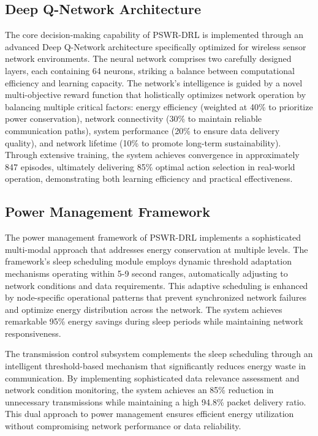 \subsection{Deep Q-Network Architecture}
\label{subsec:dqn_arch}
The core decision-making capability of PSWR-DRL is implemented through an advanced Deep Q-Network architecture specifically optimized for wireless sensor network environments. The neural network comprises two carefully designed layers, each containing 64 neurons, striking a balance between computational efficiency and learning capacity. The network's intelligence is guided by a novel multi-objective reward function that holistically optimizes network operation by balancing multiple critical factors: energy efficiency (weighted at 40\% to prioritize power conservation), network connectivity (30\% to maintain reliable communication paths), system performance (20\% to ensure data delivery quality), and network lifetime (10\% to promote long-term sustainability). Through extensive training, the system achieves convergence in approximately 847 episodes, ultimately delivering 85\% optimal action selection in real-world operation, demonstrating both learning efficiency and practical effectiveness.

\subsection{Power Management Framework}
The power management framework of PSWR-DRL implements a sophisticated multi-modal approach that addresses energy conservation at multiple levels. The framework's sleep scheduling module employs dynamic threshold adaptation mechanisms operating within 5-9 second ranges, automatically adjusting to network conditions and data requirements. This adaptive scheduling is enhanced by node-specific operational patterns that prevent synchronized network failures and optimize energy distribution across the network. The system achieves remarkable 95\% energy savings during sleep periods while maintaining network responsiveness.

The transmission control subsystem complements the sleep scheduling through an intelligent threshold-based mechanism that significantly reduces energy waste in communication. By implementing sophisticated data relevance assessment and network condition monitoring, the system achieves an 85\% reduction in unnecessary transmissions while maintaining a high 94.8\% packet delivery ratio. This dual approach to power management ensures efficient energy utilization without compromising network performance or data reliability.

